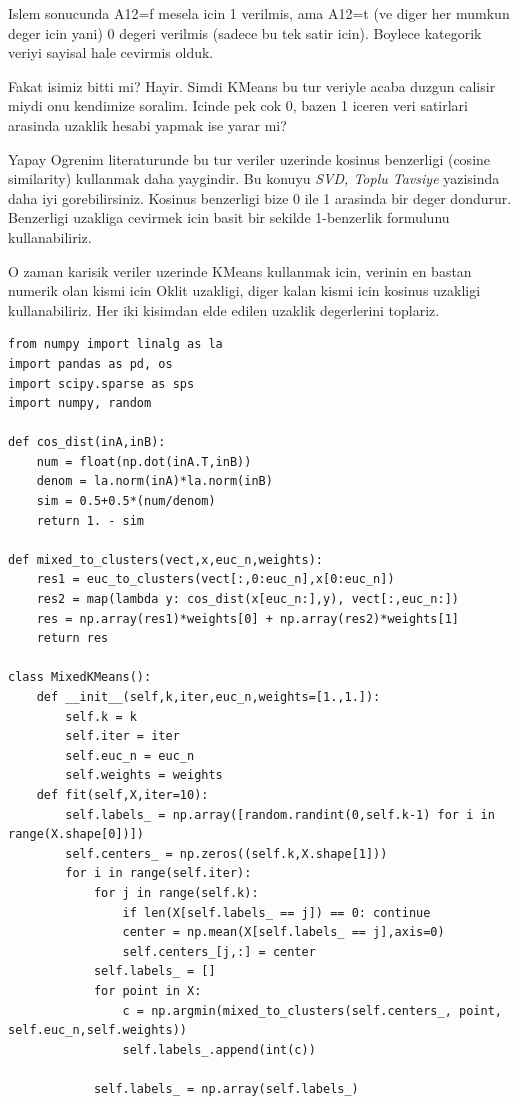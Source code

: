 \documentclass[12pt,fleqn]{article}\usepackage{../common}
\begin{document}
Islem sonucunda A12=f mesela icin 1 verilmis, ama A12=t (ve diger her
mumkun deger icin yani) 0 degeri verilmis (sadece bu tek satir
icin). Boylece kategorik veriyi sayisal hale cevirmis olduk.

Fakat isimiz bitti mi? Hayir. Simdi KMeans bu tur veriyle acaba duzgun
calisir miydi onu kendimize soralim. Icinde pek cok 0, bazen 1 iceren 
veri satirlari arasinda uzaklik hesabi yapmak ise yarar mi?

Yapay Ogrenim literaturunde bu tur veriler uzerinde kosinus benzerligi
(cosine similarity) kullanmak daha yaygindir. Bu konuyu {\em SVD, Toplu
Tavsiye} yazisinda daha iyi gorebilirsiniz. Kosinus benzerligi bize
0 ile 1 arasinda bir deger dondurur. Benzerligi uzakliga cevirmek icin
basit bir sekilde 1-benzerlik formulunu kullanabiliriz.

O zaman karisik veriler uzerinde KMeans kullanmak icin, verinin en
bastan numerik olan kismi icin Oklit uzakligi, diger kalan kismi icin
kosinus uzakligi kullanabiliriz. Her iki kisimdan elde edilen uzaklik
degerlerini toplariz.

\begin{verbatim}
from numpy import linalg as la
import pandas as pd, os
import scipy.sparse as sps
import numpy, random

def cos_dist(inA,inB):
    num = float(np.dot(inA.T,inB))
    denom = la.norm(inA)*la.norm(inB)
    sim = 0.5+0.5*(num/denom)
    return 1. - sim

def mixed_to_clusters(vect,x,euc_n,weights):
    res1 = euc_to_clusters(vect[:,0:euc_n],x[0:euc_n])
    res2 = map(lambda y: cos_dist(x[euc_n:],y), vect[:,euc_n:])
    res = np.array(res1)*weights[0] + np.array(res2)*weights[1]
    return res

class MixedKMeans():
    def __init__(self,k,iter,euc_n,weights=[1.,1.]):
        self.k = k
        self.iter = iter
        self.euc_n = euc_n
        self.weights = weights
    def fit(self,X,iter=10):
        self.labels_ = np.array([random.randint(0,self.k-1) for i in range(X.shape[0])])
        self.centers_ = np.zeros((self.k,X.shape[1]))
        for i in range(self.iter):
            for j in range(self.k):
                if len(X[self.labels_ == j]) == 0: continue
                center = np.mean(X[self.labels_ == j],axis=0)
                self.centers_[j,:] = center
            self.labels_ = []
            for point in X:
                c = np.argmin(mixed_to_clusters(self.centers_, point, self.euc_n,self.weights))
                self.labels_.append(int(c))

            self.labels_ = np.array(self.labels_)
\end{verbatim}
\end{document}

